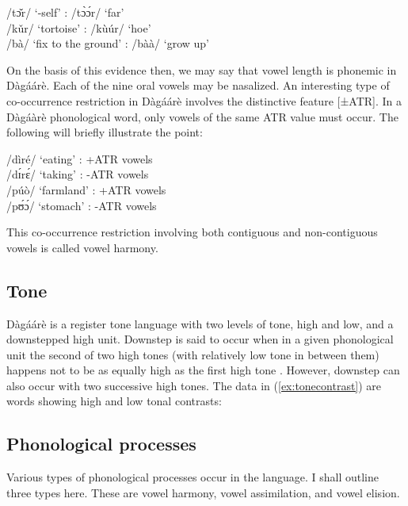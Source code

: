 \ea /tɔ̌r/ ‘-self’ : /tɔ̀ɔ́r/ ‘far’\\
/kǔr/ ‘tortoise’ : /kùúr/ ‘hoe’\\
/bà/ ‘fix to the ground’ : /bàà/ ‘grow up’
\z



On the basis of this evidence then, we may say that vowel length is phonemic in Dàgáárè. Each of the nine oral vowels may be nasalized. An interesting type of co-occurrence restriction in Dàgáárè involves the distinctive feature [±ATR]. In a Dàgáàrè phonological word, only vowels of the same ATR value must occur. The following will briefly illustrate the point:


\ea \label{ex:vowelharmony}/dìré/ ‘eating’ : +ATR vowels\\
/dɪ́rɛ́/ ‘taking’ : -ATR vowels\\
/púò/ ‘farmland’ : +ATR vowels\\
/pʊ́ɔ́/ ‘stomach’ : -ATR vowels\\
\z

This co-occurrence restriction involving both contiguous and non-contiguous vowels is called vowel harmony.

\subsection{Tone}
Dàgáárè is a register tone language with two levels of tone, high and low, and a
downstepped high unit. Downstep is said to occur when in a given phonological unit the
second of two high tones (with relatively low tone in between them) happens not to be as
equally high as the first high tone \citep{Kennedy1966}. However, downstep can also occur with two successive high tones. The data in 
(\ref{ex:tonecontrast}) are words showing high and low tonal contrasts:

\subsection{Phonological processes}

Various types of phonological processes occur in the language. I shall
outline three types here. These are vowel harmony, vowel assimilation, and vowel elision.

